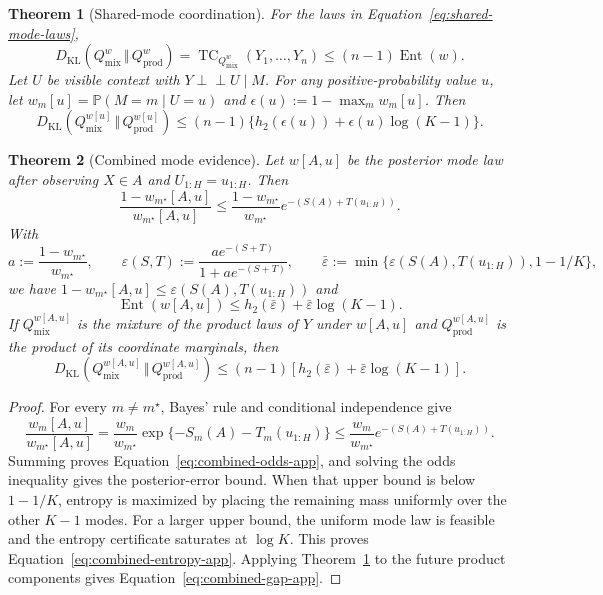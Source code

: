 \documentclass[10pt,a4paper]{amsart}
\newtheorem{theorem}{Theorem}
\newcommand{\Ent}{\operatorname{Ent}}
\newcommand{\KL}{D_{\mathrm{KL}}}
\newcommand{\TC}{\operatorname{TC}}
\newcommand{\kldiv}{\,\Vert\,}
\begin{document}
\begin{theorem}[Shared-mode coordination]
\label{thm:shared-mode}
For the laws in Equation~\eqref{eq:shared-mode-laws},
\begin{equation}
 \KL(Q_{\mathrm{mix}}^w\kldiv Q_{\mathrm{prod}}^w)
 =\TC_{Q_{\mathrm{mix}}^w}(Y_1,\ldots,Y_n)
 \le(n-1)\Ent(w).
 \label{eq:shared-mode-gap}
\end{equation}
Let $U$ be visible context with $Y\perp\!\!\!\perp U\mid M$. For any
positive-probability value $u$, let $w_m[u]=\mathbb P(M=m\mid U=u)$ and
$\epsilon(u):=1-\max_m w_m[u]$. Then
\begin{equation}
 \KL(Q_{\mathrm{mix}}^{w[u]}\kldiv Q_{\mathrm{prod}}^{w[u]})
 \le(n-1)\{h_2(\epsilon(u))+\epsilon(u)\log(K-1)\}.
 \label{eq:context-mode-gap}
\end{equation}
\end{theorem}

\begin{theorem}[Combined mode evidence]
\label{thm:combined-evidence}
Let $w[A,u]$ be the posterior mode law after observing $X\in A$ and
$U_{1:H}=u_{1:H}$. Then
\begin{equation}
 \frac{1-w_{m^\star}[A,u]}{w_{m^\star}[A,u]}
 \le
 \frac{1-w_{m^\star}}{w_{m^\star}}
 e^{-(S(A)+T(u_{1:H}))}.
 \label{eq:combined-odds-app}
\end{equation}
With
\begin{equation}
 a:=\frac{1-w_{m^\star}}{w_{m^\star}},
 \qquad
 \varepsilon(S,T):=\frac{ae^{-(S+T)}}{1+ae^{-(S+T)}},
 \qquad
 \bar\varepsilon:=\min\{\varepsilon(S(A),T(u_{1:H})),1-1/K\},
 \label{eq:combined-error-app}
\end{equation}
we have
$1-w_{m^\star}[A,u]\le\varepsilon(S(A),T(u_{1:H}))$ and
\begin{equation}
 \Ent(w[A,u])
 \le h_2(\bar\varepsilon)+\bar\varepsilon\log(K-1).
 \label{eq:combined-entropy-app}
\end{equation}
If $Q_{\mathrm{mix}}^{w[A,u]}$ is the mixture of the product laws of $Y$ under
$w[A,u]$ and $Q_{\mathrm{prod}}^{w[A,u]}$ is the product of its coordinate
marginals, then
\begin{equation}
 \KL(Q_{\mathrm{mix}}^{w[A,u]}\kldiv Q_{\mathrm{prod}}^{w[A,u]})
 \le(n-1)
 \left[h_2(\bar\varepsilon)+\bar\varepsilon\log(K-1)\right].
 \label{eq:combined-gap-app}
\end{equation}
\end{theorem}

\begin{proof}
For every $m\ne m^\star$, Bayes' rule and conditional independence give
\[
 \frac{w_m[A,u]}{w_{m^\star}[A,u]}
 =\frac{w_m}{w_{m^\star}}
 \exp\{-S_m(A)-T_m(u_{1:H})\}
 \le\frac{w_m}{w_{m^\star}}
 e^{-(S(A)+T(u_{1:H}))}.
\]
Summing proves Equation~\eqref{eq:combined-odds-app}, and solving the odds
inequality gives the posterior-error bound. When that upper bound is below
$1-1/K$, entropy is maximized by placing the remaining mass uniformly over
the other $K-1$ modes. For a larger upper bound, the uniform mode law is
feasible and the entropy certificate saturates at $\log K$. This proves
Equation~\eqref{eq:combined-entropy-app}. Applying
Theorem~\ref{thm:shared-mode} to the future product components gives
Equation~\eqref{eq:combined-gap-app}.
\end{proof}
\end{document}
